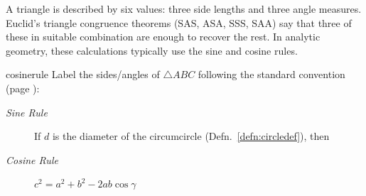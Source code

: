 \goodbreak



A triangle is described by six values: three side lengths and three angle measures. Euclid's triangle congruence theorems (SAS, ASA, SSS, SAA) say that three of these in suitable combination are enough to recover the rest. In analytic geometry, these calculations typically use the sine and cosine rules.

\begin{thm}{}{cosinerule}
	Label the sides/angles of $\triangle ABC$ following the standard convention (page \pageref{sec:analyticangle}):
	\begin{description}
		\item[\normalfont\emph{Sine Rule}] If $d$ is the diameter of the circumcircle (Defn.\ \ref{defn:circledef}), then \ 
		\item[\normalfont\emph{Cosine Rule}] $c^2=a^2+b^2-2ab\cos\gamma$
	\end{description}
\end{thm}


